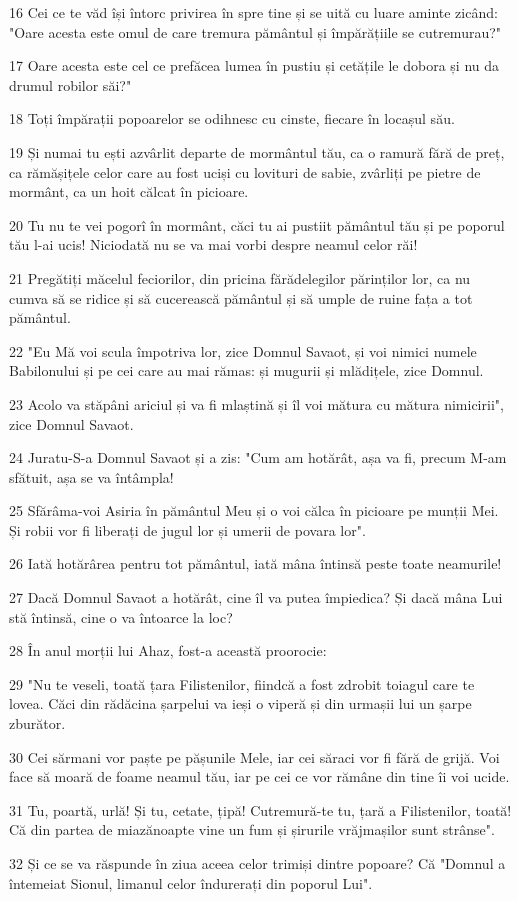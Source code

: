 \par 16 Cei ce te văd își întorc privirea în spre tine și se uită cu luare aminte zicând: "Oare acesta este omul de care tremura pământul și împărățiile se cutremurau?"
\par 17 Oare acesta este cel ce prefăcea lumea în pustiu și cetățile le dobora și nu da drumul robilor săi?"
\par 18 Toți împărații popoarelor se odihnesc cu cinste, fiecare în locașul său.
\par 19 Și numai tu ești azvârlit departe de mormântul tău, ca o ramură fără de preț, ca rămășițele celor care au fost uciși cu lovituri de sabie, zvârliți pe pietre de mormânt, ca un hoit călcat în picioare.
\par 20 Tu nu te vei pogorî în mormânt, căci tu ai pustiit pământul tău și pe poporul tău l-ai ucis! Niciodată nu se va mai vorbi despre neamul celor răi!
\par 21 Pregătiți măcelul feciorilor, din pricina fărădelegilor părinților lor, ca nu cumva să se ridice și să cucerească pământul și să umple de ruine fața a tot pământul.
\par 22 "Eu Mă voi scula împotriva lor, zice Domnul Savaot, și voi nimici numele Babilonului și pe cei care au mai rămas: și mugurii și mlădițele, zice Domnul.
\par 23 Acolo va stăpâni ariciul și va fi mlaștină și îl voi mătura cu mătura nimicirii", zice Domnul Savaot.
\par 24 Juratu-S-a Domnul Savaot și a zis: "Cum am hotărât, așa va fi, precum M-am sfătuit, așa se va întâmpla!
\par 25 Sfărâma-voi Asiria în pământul Meu și o voi călca în picioare pe munții Mei. Și robii vor fi liberați de jugul lor și umerii de povara lor".
\par 26 Iată hotărârea pentru tot pământul, iată mâna întinsă peste toate neamurile!
\par 27 Dacă Domnul Savaot a hotărât, cine îl va putea împiedica? Și dacă mâna Lui stă întinsă, cine o va întoarce la loc?
\par 28 În anul morții lui Ahaz, fost-a această proorocie:
\par 29 "Nu te veseli, toată țara Filistenilor, fiindcă a fost zdrobit toiagul care te lovea. Căci din rădăcina șarpelui va ieși o viperă și din urmașii lui un șarpe zburător.
\par 30 Cei sărmani vor paște pe pășunile Mele, iar cei săraci vor fi fără de grijă. Voi face să moară de foame neamul tău, iar pe cei ce vor rămâne din tine îi voi ucide.
\par 31 Tu, poartă, urlă! Și tu, cetate, țipă! Cutremură-te tu, țară a Filistenilor, toată! Că din partea de miazănoapte vine un fum și șirurile vrăjmașilor sunt strânse".
\par 32 Și ce se va răspunde în ziua aceea celor trimiși dintre popoare? Că "Domnul a întemeiat Sionul, limanul celor îndurerați din poporul Lui".

